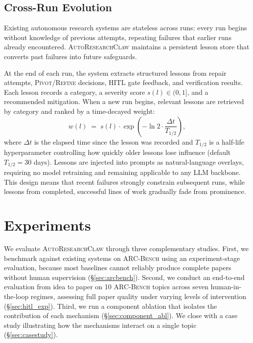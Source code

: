 \documentclass{llmxive}
\providecommand{\system}{\textsc{AutoResearchClaw}}
\providecommand{\bench}{\textsc{ARC-Bench}}
\begin{document}
\vspace{-0.3em}
\subsection{Cross-Run Evolution}
\label{sec:evolution}
\vspace{-0.3em}

Existing autonomous research systems are stateless across runs: every run begins without knowledge of previous attempts, repeating failures that earlier runs already encountered.
\system{} maintains a persistent lesson store that converts past failures into future safeguards.

At the end of each run, the system extracts structured lessons from repair attempts, \textsc{Pivot}/\textsc{Refine} decisions, HITL gate feedback, and verification results.
Each lesson records a category, a severity score $s(l) \in (0, 1]$, and a recommended mitigation.
When a new run begins, relevant lessons are retrieved by category and ranked by a time-decayed weight:
\begin{equation}
w(l) \;=\; s(l) \cdot \exp\!\left(-\ln 2 \cdot \frac{\Delta t}{T_{1/2}}\right),
\label{eq:lesson-weight}
\end{equation}
where $\Delta t$ is the elapsed time since the lesson was recorded and $T_{1/2}$ is a half-life hyperparameter controlling how quickly older lessons lose influence (default $T_{1/2} = 30$ days).
Lessons are injected into prompts as natural-language overlays, requiring no model retraining and remaining applicable to any LLM backbone.
This design means that recent failures strongly constrain subsequent runs, while lessons from completed, successful lines of work gradually fade from prominence.
\vspace{-0.5em}
\section{Experiments}
\label{sec:experiments}
\vspace{-0.5em}

We evaluate \system{} through three complementary studies. First, we benchmark against existing systems on \bench{} using an experiment-stage evaluation, because most baselines cannot reliably produce complete papers without human supervision (\S\ref{sec:arcbench}). Second, we conduct an end-to-end evaluation from idea to paper on 10 \bench{} topics across seven human-in-the-loop regimes, assessing full paper quality under varying levels of intervention (\S\ref{sec:hitl_exp}). Third, we run a component ablation that isolates the contribution of each mechanism (\S\ref{sec:component_abl}). We close with a case study illustrating how the mechanisms interact on a single topic (\S\ref{sec:casestudy}).
\end{document}
